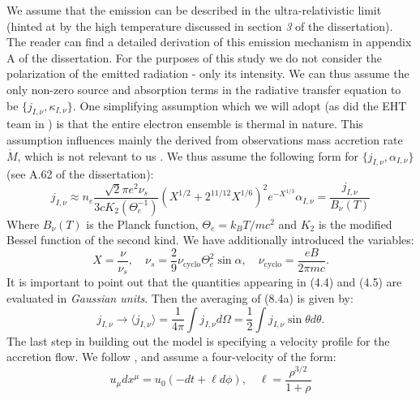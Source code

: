 \documentclass[12pt]{article}
\numberwithin{equation}{section}
\numberwithin{figure}{section}
\begin{document}
	We assume that the emission can be described in the ultra-relativistic limit (hinted at by the high temperature discussed in section \emph{3} of the dissertation). The reader can find a detailed derivation of this emission mechanism in appendix A of the dissertation. For the purposes of this study we do not consider the polarization of the emitted radiation - only its intensity. We can thus assume the only non-zero source and absorption terms in the radiative transfer equation to be $\{j_{I,\nu}, \kappa_{I,\nu}\}.$ One simplifying assumption which we will adopt (as did the EHT team in \cite{EHT_M87_VIII}) is that the entire electron ensemble is thermal in nature. This assumption influences mainly the derived from observations mass accretion rate $\dot{M}$, which is not relevant to us \cite{EHT_M87_VIII}. We thus assume the following form for $\{j_{I,\nu}, \alpha_{I,\nu}\}$ (see A.62 of the dissertation):
	\begin{subequations}
		\begin{equation}
			j_{I,\nu}\approx n_e \frac{\sqrt{2}\pi e^2\nu_s}{3cK_2(\Theta_e^{-1})}\left(X^{1/2} + 2^{11/12}X^{1/6}\right)^2 e^{-X^{1/3}}
		\end{equation}
		\begin{equation}
			\alpha_{I,\nu} = \frac{j_{I,\nu}}{B_\nu(T)}
		\end{equation}
	\end{subequations}
	Where $B_\nu(T)$ is the Planck function, $\Theta_e = k_BT/mc^2$ and $K_2$ is the modified Bessel function of the second kind. We have additionally introduced the variables:
	\begin{equation}
		X = \frac{\nu}{\nu_s},\quad \nu_s = \frac{2}{9}\nu_\text{cyclo}\Theta_e^2\sin\alpha, \quad \nu_\text{cyclo} = \frac{eB}{2\pi m c}.
	\end{equation}
	It is important to point out that the quantities appearing in (4.4) and (4.5) are evaluated in \emph{Gaussian units}. Then the averaging of (8.4a) is given by:
	\begin{equation}
		j_{I,\nu}\rightarrow\langle j_{I,\nu} \rangle = \frac{1}{4\pi}\int j_{I,\nu} d\Omega = \frac{1}{2}\int j_{I,\nu} \sin\theta d\theta.
	\end{equation}
	The last step in building out the model is specifying a velocity profile for the accretion flow. We follow \cite{Broderick2021}, \cite{Gold2020} and assume a four-velocity of the form:
	\begin{equation}
		u_\mu dx^\mu = u_0(-dt + \ell d\phi),\quad \ell = \frac{\rho^{3/2}}{1 +\rho}
	\end{equation}
\end{document}
